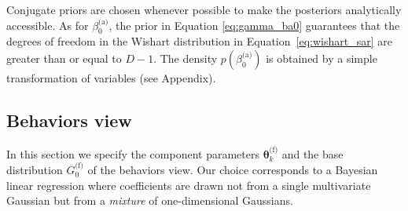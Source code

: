 \documentclass[smallextended]{svjour3}          %
\newcommand{\betaoa}{\beta_{0}^\text{(a)}}
\begin{document}
Conjugate priors are chosen whenever possible to make the posteriors analytically accessible. As for $\betaoa$, the prior in Equation \ref{eq:gamma_ba0} guarantees that the degrees of freedom in the Wishart distribution in Equation~\ref{eq:wishart_sar} are greater than or equal to $D-1$. The density $p(\betaoa)$ is obtained by a simple transformation of variables (see Appendix).

\subsection{Behaviors view}\label{sec:forums_behaviors}
In this section we specify the component parameters $\boldsymbol{\theta}_k^{\text{(f)}}$ and the base distribution $G_0^{\text{(f)}}$ of the behaviors view. Our choice corresponds to a Bayesian linear regression where coefficients are drawn not from a single multivariate Gaussian but from a \emph{mixture} of one-dimensional Gaussians.
\end{document}
